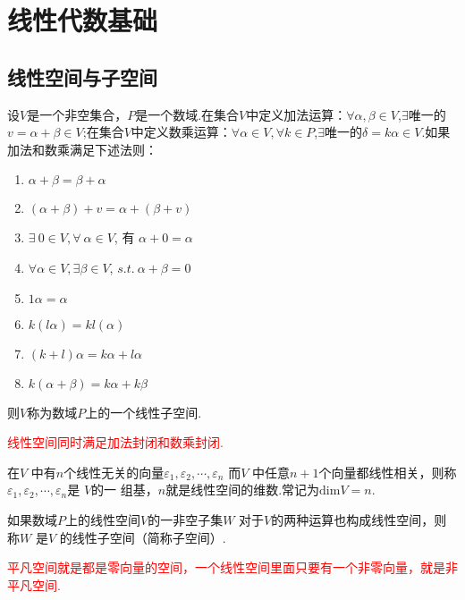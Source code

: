 \newpage
\section{线性代数基础}
\subsection{线性空间与子空间}

\begin{definition}[线性空间]
	设$V$是一个非空集合，$P$是一个数域.在集合$V$中定义加法运算：$\forall \alpha,\beta \in V$,$\exists$唯一的$v=\alpha+\beta\in V$;在集合$V$中定义数乘运算：$\forall \alpha \in V, \forall k \in P $,$\exists$唯一的$\delta=k\alpha\in V$.如果加法和数乘满足下述法则：
	\begin{enumerate}
		\item $\alpha+\beta=\beta+\alpha$
		\item $(\alpha+\beta)+v=\alpha+(\beta+v)$
		\item  $\exists\ 0 \in V, \forall \ \alpha \in V $, 有 $ \alpha+0=\alpha $
		\item $\forall \alpha \in V, \exists \beta \in V $, $s.t.\ \alpha+\beta=0 $
		\item $1\alpha=\alpha$
		\item $k(l \alpha)=kl( \alpha)$
		\item  $(k+l) \alpha=k \alpha+l\alpha$
		\item  $k(\alpha+\beta)=k \alpha+k\beta$
	\end{enumerate}
则$V$称为数域$P$上的一个线性子空间.
\end{definition}

\begin{note}
	\textcolor{red}{线性空间同时满足加法封闭和数乘封闭.}
\end{note}

\begin{definition}[线性空间的基和维数]
在$V$ 中有$n$个线性无关的向量$\varepsilon_1,\varepsilon_2,\cdots,\varepsilon_n $
而$V$ 中任意$n+1$个向量都线性相关，则称$\varepsilon_1,\varepsilon_2,\cdots,\varepsilon_n $是 $V$的一
组基，$n$就是线性空间的维数.常记为$\mathrm{dim}V=n.$
\end{definition}

\begin{definition}[线性子空间]
如果数域$P$上的线性空间$V$的一非空子集$W$
	对于$V$的两种运算也构成线性空间，则称$W$
	是$V$ 的线性子空间（简称子空间）. 
\end{definition}
\begin{note}
	\textcolor{red}{平凡空间就是都是零向量的空间，一个线性空间里面只要有一个非零向量，就是非平凡空间.}
\end{note}

